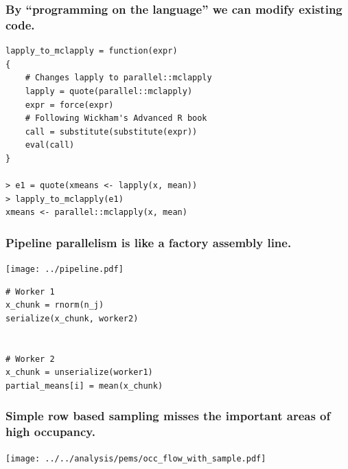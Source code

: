 \documentclass{beamer}
\begin{document}
\begin{frame}[fragile]

    \frametitle{By ``programming on the language'' we can modify existing
    code.}

\begin{verbatim}
lapply_to_mclapply = function(expr)
{
    # Changes lapply to parallel::mclapply
    lapply = quote(parallel::mclapply)
    expr = force(expr)
    # Following Wickham's Advanced R book
    call = substitute(substitute(expr))
    eval(call)
}

> e1 = quote(xmeans <- lapply(x, mean))
> lapply_to_mclapply(e1)
xmeans <- parallel::mclapply(x, mean)
\end{verbatim}

\end{frame}
\begin{frame}[fragile]

    \frametitle{Pipeline parallelism is like a factory assembly line.}

\centerline{\texttt{[image: ../pipeline.pdf]}}

\begin{verbatim}
# Worker 1
x_chunk = rnorm(n_j)
serialize(x_chunk, worker2)


# Worker 2
x_chunk = unserialize(worker1)
partial_means[i] = mean(x_chunk)
\end{verbatim}

\end{frame}
\begin{frame}

    \frametitle{Simple row based sampling misses the important areas of high
    occupancy.}

    \centerline{\texttt{[image: ../../analysis/pems/occ\_flow\_with\_sample.pdf]}}



\end{frame}
\end{document}
